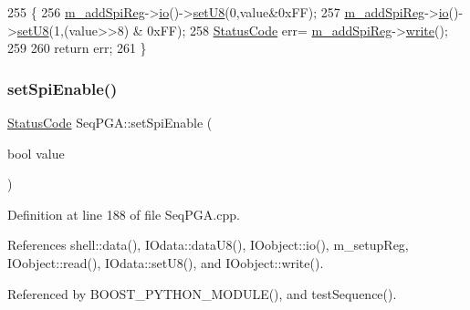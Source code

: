 \begin{DoxyCode}
255                                                      \{
256   \hyperlink{classSeqPGA_af31d87ad56c501584ccb9c60776a1289}{m\_addSpiReg}->\hyperlink{classIOobject_af04fb94137c3d86849f478ac5afab5d1}{io}()->\hyperlink{classIOdata_a6c4fb2f2af01889ada889c2b7aceb24d}{setU8}(0,value&0xFF);
257   \hyperlink{classSeqPGA_af31d87ad56c501584ccb9c60776a1289}{m\_addSpiReg}->\hyperlink{classIOobject_af04fb94137c3d86849f478ac5afab5d1}{io}()->\hyperlink{classIOdata_a6c4fb2f2af01889ada889c2b7aceb24d}{setU8}(1,(value>>8) & 0xFF);
258   \hyperlink{classStatusCode}{StatusCode} err= \hyperlink{classSeqPGA_af31d87ad56c501584ccb9c60776a1289}{m\_addSpiReg}->\hyperlink{classIOobject_a9f6984bc9f0fadcf800f1be2523ac744}{write}();
259  
260   \textcolor{keywordflow}{return} err;
261 \}
\end{DoxyCode}
\mbox{\label{classSeqPGA_a39a6cf702c9185793f59a8a05f3a9de7}} 
\subsubsection{\texorpdfstring{set\+Spi\+Enable()}{setSpiEnable()}}
{\footnotesize\ttfamily \hyperlink{classStatusCode}{Status\+Code} Seq\+P\+G\+A\+::set\+Spi\+Enable (\begin{DoxyParamCaption}\item[{bool}]{value }\end{DoxyParamCaption})}



Definition at line 188 of file Seq\+P\+G\+A.\+cpp.



References shell\+::data(), I\+Odata\+::data\+U8(), I\+Oobject\+::io(), m\+\_\+setup\+Reg, I\+Oobject\+::read(), I\+Odata\+::set\+U8(), and I\+Oobject\+::write().



Referenced by B\+O\+O\+S\+T\+\_\+\+P\+Y\+T\+H\+O\+N\+\_\+\+M\+O\+D\+U\+L\+E(), and test\+Sequence().


